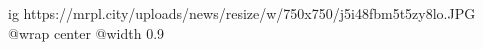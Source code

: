  
 
 
 
 

\ifcmt
  ig https://mrpl.city/uploads/news/resize/w/750x750/j5i48fbm5t5zy8lo.JPG
  @wrap center
  @width 0.9
\fi
